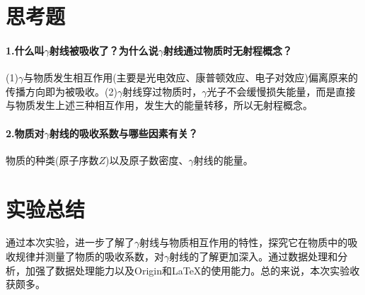 \documentclass[UTF8]{ctexart}
\begin{document}
\section{思考题}
\paragraph{1.什么叫$ \gamma $射线被吸收了？为什么说$ \gamma $射线通过物质时无射程概念？}
(1)$ \gamma $与物质发生相互作用(主要是光电效应、康普顿效应、电子对效应)偏离原来的传播方向即为被吸收。(2)$ \gamma $射线穿过物质时，$ \gamma $光子不会缓慢损失能量，而是直接与物质发生上述三种相互作用，发生大的能量转移，所以无射程概念。

\paragraph{2.物质对$ \gamma $射线的吸收系数与哪些因素有关？}
物质的种类(原子序数$ Z $)以及原子数密度、$ \gamma $射线的能量。

\section{实验总结}
通过本次实验，进一步了解了$ \gamma $射线与物质相互作用的特性，探究它在物质中的吸收规律并测量了物质的吸收系数，对$ \gamma $射线的了解更加深入。通过数据处理和分析，加强了数据处理能力以及Origin和\LaTeX{}的使用能力。总的来说，本次实验收获颇多。
\end{document}
